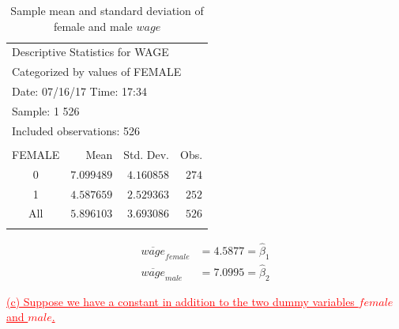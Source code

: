 \documentclass[12pt]{report}
\begin{document}
\vspace{-\baselineskip}
\begin{table}[H]
	\centering
	\begin{tabular}{lrrr}
		\multicolumn{4}{l}{Descriptive Statistics for WAGE}\\
		\multicolumn{4}{l}{Categorized by values of FEMALE}\\
		\multicolumn{3}{l}{Date: 07/16/17   Time: 17:34}&\multicolumn{1}{c}{}\\
		\multicolumn{2}{l}{Sample: 1 526}&\multicolumn{1}{c}{}&\multicolumn{1}{c}{}\\
		\multicolumn{3}{l}{Included observations: 526}&\multicolumn{1}{c}{}\\
		[4.5pt] \hline \\ [-4.5pt]
		\multicolumn{1}{c|}{FEMALE}&\multicolumn{1}{r}{Mean}&\multicolumn{1}{r}{Std. Dev.}&\multicolumn{1}{r}{Obs.}\\
		\multicolumn{1}{c|}{0}&\multicolumn{1}{r}{$7.099489$}&\multicolumn{1}{r}{$4.160858$}&\multicolumn{1}{r}{$274$}\\
		\multicolumn{1}{c|}{1}&\multicolumn{1}{r}{$4.587659$}&\multicolumn{1}{r}{$2.529363$}&\multicolumn{1}{r}{$252$}\\
		\multicolumn{1}{c|}{All}&\multicolumn{1}{r}{$5.896103$}&\multicolumn{1}{r}{$3.693086$}&\multicolumn{1}{r}{$526$}\\
		[4.5pt] \hline \\ [-4.5pt]
	\end{tabular}
	\caption{Sample mean and standard deviation of female and male $wage$}
\end{table} \vspace{-\baselineskip} \begin{align*} 
	\overline{wage}_{female} &= 4.5877 = \hat{\beta}_1 \\
	\overline{wage}_{male} &= 7.0995 = \hat{\beta}_2
\end{align*} 

\newpage
\noindent \textcolor{red}
{
	\ul{(c) Suppose we have a constant in addition to the two dummy variables $female$ and $male$.}
}
\end{document}
